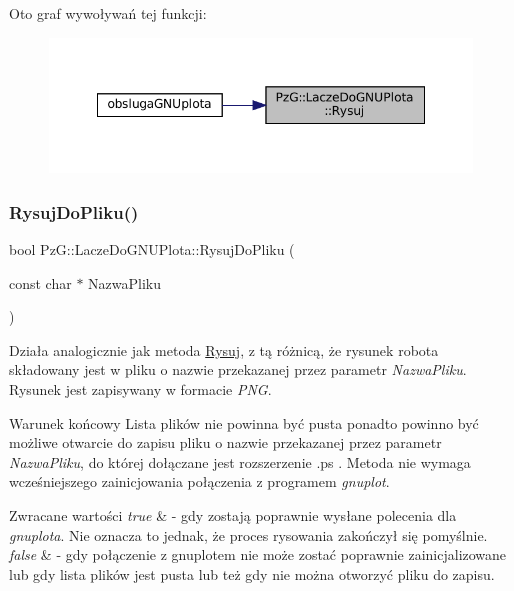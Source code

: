 Oto graf wywoływań tej funkcji\+:\nopagebreak
\begin{figure}[H]
\begin{center}
\leavevmode
\includegraphics[width=348pt]{class_pz_g_1_1_lacze_do_g_n_u_plota_a065f5b8402737cc62b0ad4f66d028335_icgraph}
\end{center}
\end{figure}
\mbox{\label{class_pz_g_1_1_lacze_do_g_n_u_plota_addae9ac156ae2fb227f792faff3aa148}} 
\subsubsection{\texorpdfstring{RysujDoPliku()}{RysujDoPliku()}}
{\footnotesize\ttfamily bool Pz\+G\+::\+Lacze\+Do\+G\+N\+U\+Plota\+::\+Rysuj\+Do\+Pliku (\begin{DoxyParamCaption}\item[{const char $\ast$}]{Nazwa\+Pliku }\end{DoxyParamCaption})}

Działa analogicznie jak metoda \mbox{\hyperlink{class_pz_g_1_1_lacze_do_g_n_u_plota_a065f5b8402737cc62b0ad4f66d028335}{Rysuj}}, z tą różnicą, że rysunek robota składowany jest w pliku o nazwie przekazanej przez parametr {\itshape Nazwa\+Pliku}. Rysunek jest zapisywany w formacie {\itshape P\+NG}.

\begin{DoxyPostcond}{Warunek końcowy}
Lista plików nie powinna być pusta ponadto powinno być możliwe otwarcie do zapisu pliku o nazwie przekazanej przez parametr {\itshape Nazwa\+Pliku}, do której dołączane jest rozszerzenie .ps . Metoda nie wymaga wcześniejszego zainicjowania połączenia z programem {\itshape gnuplot}.
\end{DoxyPostcond}

\begin{DoxyRetVals}{Zwracane wartości}
{\em true} & -\/ gdy zostają poprawnie wysłane polecenia dla {\itshape gnuplota}. Nie oznacza to jednak, że proces rysowania zakończył się pomyślnie. \\
\hline
{\em false} & -\/ gdy połączenie z gnuplotem nie może zostać poprawnie zainicjalizowane lub gdy lista plików jest pusta lub też gdy nie można otworzyć pliku do zapisu. \\
\hline
\end{DoxyRetVals}


